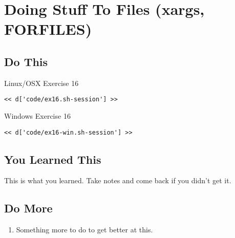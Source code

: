 \chapter{Doing Stuff To Files (xargs, FORFILES)}

\section{Do This}

\begin{code}{Linux/OSX Exercise 16}
\begin{Verbatim}
<< d['code/ex16.sh-session'] >>
\end{Verbatim}
\end{code}

\begin{code}{Windows Exercise 16}
\begin{Verbatim}
<< d['code/ex16-win.sh-session'] >>
\end{Verbatim}
\end{code}

\section{You Learned This}

This is what you learned.  Take notes and come back if you didn't get it.

\section{Do More}

\begin{enumerate}
\item Something more to do to get better at this.
\end{enumerate}

